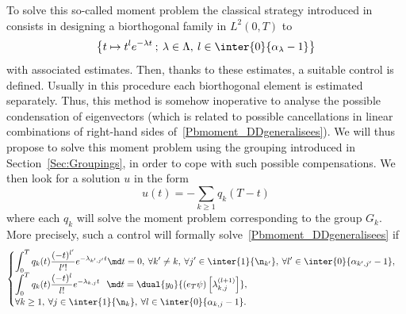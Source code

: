 To solve this so-called moment problem the classical strategy introduced in~\cite{FattoriniRussell71} consists in designing a biorthogonal family in $L^2(0,T)$ to
\[
\left\{ t \mapsto t^l e^{-\lambda t} \: ; \: \lambda \in \Lambda, \: l \in \inter{0}{\alpha_\lambda -1} \right\}
\]
with associated estimates. Then, thanks to these estimates, a suitable control is defined. Usually in this procedure each biorthogonal element is estimated separately. Thus, this method is somehow inoperative to analyse the possible condensation of eigenvectors (which is related to possible cancellations in linear combinations of right-hand sides of~\eqref{Pbmoment_DDgeneralisees}). We will thus propose to solve this moment problem using the grouping introduced in Section~\ref{Sec:Groupings}, in order to cope with such possible compensations. We then look for a solution $u$ in the form
\begin{equation}\label{FormeControle}
u(t) = - \sum_{k \geq 1} q_k(T-t)
\end{equation}
where each $q_k$ will solve the moment problem corresponding to the group $G_k$. More precisely, such a control will formally solve~\eqref{Pbmoment_DDgeneralisees} if
\begin{equation}\label{Def:GBF_DD}
\begin{cases}
\displaystyle\int_0^T q_k(t) \frac{(-t)^{l'}}{l'!} e^{-\lambda_{k',j'} t} \md t = 0, \: \forall k' \neq k, \: \forall j'\in \inter{1}{\n_{k'}}, \: \forall l' \in \inter{0}{\alpha_{k',j'}-1},
\\[0.15em]
\displaystyle\int_0^T q_k(t) \frac{(-t)^l}{l!} e^{-\lambda_{k,j} t}\;\;\, \md t = \dual{y_0}{(e_T \psi) \left[\lambda_{k,j}^{(l+1)}\right] },
\\[0.15em]
\displaystyle\forall k \geq 1, \: \forall j \in \inter{1}{\n_k}, \: \forall l \in \inter{0}{\alpha_{k,j}-1}.
\end{cases}
\end{equation}


